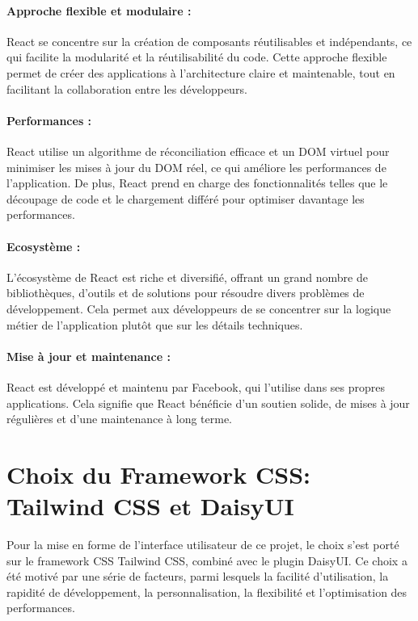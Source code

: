 \paragraph{Approche flexible et modulaire :} React se concentre sur la création de composants réutilisables et indépendants, ce qui facilite la modularité et la réutilisabilité du code. Cette approche flexible permet de créer des applications à l'architecture claire et maintenable, tout en facilitant la collaboration entre les développeurs.
\paragraph{Performances :} React utilise un algorithme de réconciliation efficace et un \Gls{DOM} virtuel pour minimiser les mises à jour du \Gls{DOM} réel, ce qui améliore les performances de l'application. De plus, React prend en charge des fonctionnalités telles que le découpage de code et le chargement différé pour optimiser davantage les performances.

\paragraph{Ecosystème :} L'écosystème de React est riche et diversifié, offrant un grand nombre de bibliothèques, d'outils et de solutions pour résoudre divers problèmes de développement. Cela permet aux développeurs de se concentrer sur la logique métier de l'application plutôt que sur les détails techniques.

\paragraph{Mise à jour et maintenance :} React est développé et maintenu par Facebook, qui l'utilise dans ses propres applications. Cela signifie que React bénéficie d'un soutien solide, de mises à jour régulières et d'une maintenance à long terme.

\section{Choix du Framework CSS: Tailwind CSS et DaisyUI}

Pour la mise en forme de l'interface utilisateur de ce projet, le choix s'est porté sur le framework CSS Tailwind CSS, combiné avec le plugin DaisyUI. Ce choix a été motivé par une série de facteurs, parmi lesquels la facilité d'utilisation, la rapidité de développement, la personnalisation, la flexibilité et l'optimisation des performances.

